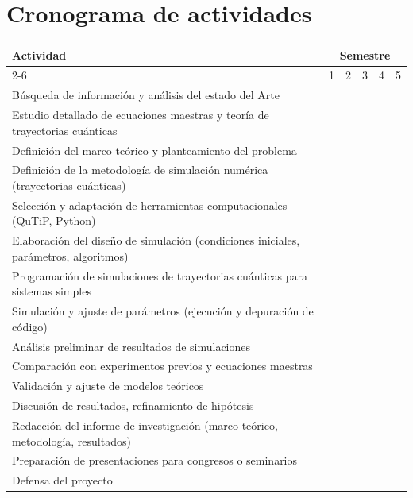 \documentclass[12pt]{article}
\begin{document}
\section{Cronograma de actividades}


\begin{table}[h!]
\centering
\renewcommand{\arraystretch}{1.5}
\begin{tabular}{|p{9cm}|c|c|c|c|c|}
\hline
\textbf{Actividad} & \multicolumn{5}{c|}{\textbf{Semestre}} \\ \cline{2-6} 
 & 1 & 2 & 3 & 4 & 5 \\ \hline

Búsqueda de información y análisis del estado del Arte & \cellcolor{green} & & & & \\ \hline
Estudio detallado de ecuaciones maestras y teoría de trayectorias cuánticas & \cellcolor{green} & & & & \\ \hline
Definición del marco teórico y planteamiento del problema & \cellcolor{green} & & & & \\ \hline

Definición de la metodología de simulación numérica (trayectorias cuánticas) & & \cellcolor{green} & & & \\ \hline
Selección y adaptación de herramientas computacionales (QuTiP, Python) & & \cellcolor{green} & & & \\ \hline
Elaboración del diseño de simulación (condiciones iniciales, parámetros, algoritmos) & & \cellcolor{green} & & & \\ \hline
Programación de simulaciones de trayectorias cuánticas para sistemas simples & & \cellcolor{green} & & & \\ \hline
Simulación y ajuste de parámetros (ejecución y depuración de código) & & \cellcolor{green} & & & \\ \hline
Análisis preliminar de resultados de simulaciones & & \cellcolor{green} & & & \\ \hline

Comparación con experimentos previos y ecuaciones maestras & & & \cellcolor{green} & & \\ \hline
Validación y ajuste de modelos teóricos & & & \cellcolor{green} & & \\ \hline
Discusión de resultados, refinamiento de hipótesis & & & \cellcolor{green} & & \\ \hline

Redacción del informe de investigación (marco teórico, metodología, resultados) & & & \cellcolor{green} & \cellcolor{green} & \cellcolor{green} \\ \hline
Preparación de presentaciones para congresos o seminarios & & & & \cellcolor{green} & \cellcolor{green} \\ \hline
Defensa del proyecto & & & & \cellcolor{green} & \cellcolor{green} \\ \hline

\end{tabular}
\end{table}



\newpage

\printbibliography
\end{document}
